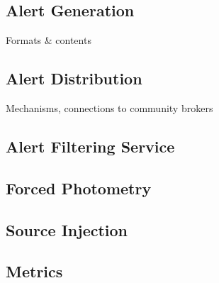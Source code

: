 
\subsection{Alert Generation}

Formats \& contents

\subsection{Alert Distribution}

Mechanisms, connections to community brokers

\subsection{Alert Filtering Service}

\subsection{Forced Photometry}

\subsection{Source Injection}

\subsection{Metrics}